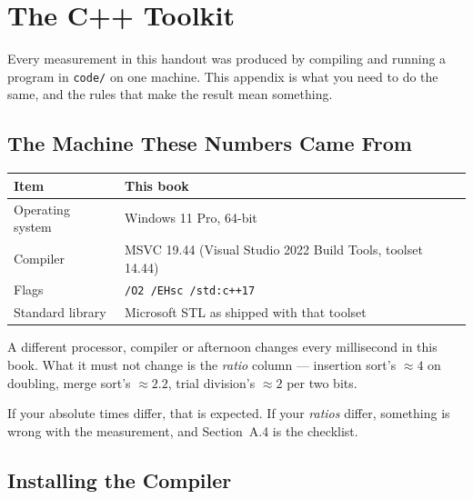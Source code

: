 \chapter{The C++ Toolkit}\label{app:toolkit}
\normalfigures

Every measurement in this handout was produced by compiling and running a
program in \texttt{code/} on one machine. This appendix is what you need to do
the same, and the rules that make the result mean something.

\section{The Machine These Numbers Came From}

\begin{longtable}{@{}L{4.4cm}L{10.1cm}@{}}
\toprule
{}
\textbf{Item} & \textbf{This book} \\
\midrule
\endhead
Operating system & Windows 11 Pro, 64-bit \\
Compiler & MSVC 19.44 (Visual Studio 2022 Build Tools, toolset 14.44) \\
Flags & \texttt{/O2 /EHsc /std:c++17} \\
Standard library & Microsoft STL as shipped with that toolset \\
\bottomrule
\end{longtable}

\begin{alertbox}
A different processor, compiler or afternoon changes every millisecond in this
book. What it must not change is the \emph{ratio} column --- insertion sort's
$\approx 4$ on doubling, merge sort's $\approx 2.2$, trial division's
$\approx 2$ per two bits.

\smallskip
If your absolute times differ, that is expected. If your \emph{ratios} differ,
something is wrong with the measurement, and Section~A.4 is the checklist.
\end{alertbox}

\section{Installing the Compiler}

